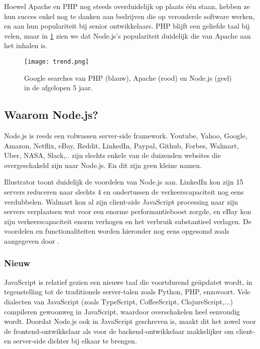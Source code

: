 Hoewel Apache en PHP nog steeds overduidelijk op plaats één staan, hebben ze hun succes enkel nog te danken aan bedrijven die op verouderde software werken, en aan hun populariteit bij senior ontwikkelaars. PHP blijft een geliefde taal bij velen, maar in \ref{fig:trend} zien we dat Node.js's populariteit duidelijk die van Apache aan het inhalen is. \autocite{SimilarTech}

\begin{figure}[h]
	\texttt{[image: trend.png]}
	\caption{Google searches van PHP (blauw), Apache (rood) en Node.js (geel) in de afgelopen 5 jaar.}
	\label{fig:trend}
\end{figure}

\subsection{Waarom Node.js?}
\label{sec:whyNode}
Node.js is reeds een volwassen server-side framework. Youtube, Yahoo, Google, Amazon, Netflix, eBay, Reddit, LinkedIn, Paypal, Github, Forbes, Walmart, Uber, NASA, Slack,.. zijn slechts enkele van de duizenden websites die overgeschakeld zijn naar Node.js. En dit zijn geen kleine namen.

Illustrator \textcite{Mehmet2016} toont duidelijk de voordelen van Node.js aan. LinkedIn kon zijn 15 servers reduceren naar slechts 4 en ondertussen de verkeerscapaciteit nog eens verdubbelen. Walmart kon al zijn client-side JavaScript processing naar zijn servers verplaatsen wat voor een enorme performantieboost zorgde, en eBay kon zijn verkeerscapaciteit enorm verhogen en het verbruik substantieel verlagen. De voordelen en functionaliteiten worden hieronder nog eens opgesomd zoals aangegeven door \textcite{Chandrayan2017}.

\subsubsection{Nieuw}
\label{sec:new}

JavaScript is relatief gezien een nieuwe taal die voortdurend geüpdatet wordt, in tegenstelling tot de traditionele server-talen zoals Python, PHP, enzovoort. Vele dialecten van JavaScript (zoals TypeScript, CoffeeScript, ClojureScript,...) compileren gewoonweg in JavaScript, waardoor overschakelen heel eenvoudig wordt. Doordat Node.js ook in JavaScript geschreven is, maakt dit het zowel voor de frontend-ontwikkelaar als voor de backend-ontwikkelaar makkelijker om client-en server-side dichter bij elkaar te brengen. \autocite{ExpressMozilla}

